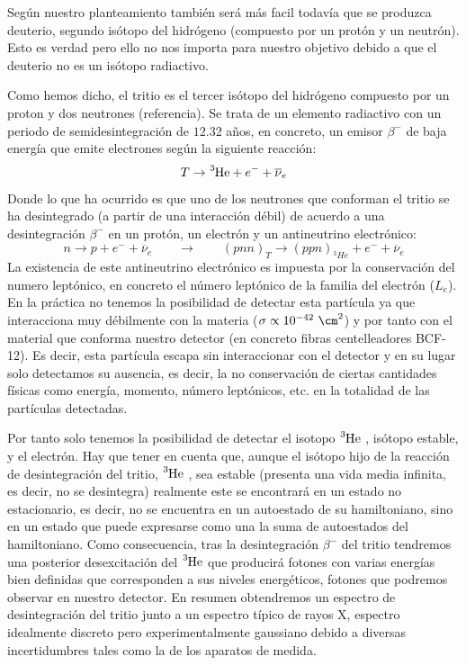 Según nuestro planteamiento también será más facil todavía que se produzca deuterio, segundo isótopo del hidrógeno (compuesto por un protón y un neutrón). Esto es verdad pero ello no nos importa para nuestro objetivo debido a que el deuterio no es un isótopo radiactivo.

Como hemos dicho, el tritio es el tercer isótopo del hidrógeno compuesto por un proton y dos neutrones (referencia). Se trata de un elemento radiactivo con un periodo de semidesintegración de $12.32$ años, en concreto, un emisor $\beta^-$ de baja energía que emite electrones según la siguiente reacción:
\begin{equation}
T \rightarrow \ce{^{3}He} + e^- + \overline{\nu}_e
\label{desintegraciontritio}
\end{equation}
Donde lo que ha ocurrido es que uno de los neutrones que conforman el tritio se ha desintegrado (a partir de una interacción débil) de acuerdo a una desintegración $\beta^-$ en un protón, un electrón y un antineutrino electrónico:
\begin{equation}
n \rightarrow p + e^- + \overline{\nu}_e \qquad \rightarrow \qquad (pnn)_T\rightarrow (ppn)_{^3He} + e^- + \overline{\nu}_e 
\label{desintegracionbeta}
\end{equation}
La existencia de este antineutrino electrónico es impuesta por la conservación del numero leptónico, en concreto el número leptónico de la familia del electrón ($L_e$). En la práctica no tenemos la posibilidad de detectar esta partícula ya que interacciona muy débilmente con la materia ($\sigma \propto 10^{-42}~\cm^2$) y por tanto con el material que conforma nuestro detector (en concreto fibras centelleadores BCF-12). Es decir, esta partícula escapa sin interaccionar con el detector y en su lugar solo detectamos su ausencia, es decir, la no conservación de ciertas cantidades físicas como energía, momento, número leptónicos, etc. en la totalidad de las partículas detectadas.

Por tanto solo tenemos la posibilidad de detectar el isotopo $\ce{^3He}$ , isótopo estable, y el electrón. Hay que tener en cuenta que, aunque el isótopo hijo de la reacción de desintegración del tritio, $\ce{^3He}$ , sea estable (presenta una vida media infinita, es decir, no se desintegra) realmente este se encontrará en un estado no estacionario, es decir, no se encuentra en un autoestado de su hamiltoniano, sino en un estado que puede expresarse como una la suma de autoestados del hamiltoniano. Como consecuencia, tras la desintegración $\beta^-$ del tritio tendremos una posterior desexcitación del $\ce{^3He}$ que producirá fotones con varias energías bien definidas que corresponden a sus niveles energéticos, fotones que podremos observar en nuestro detector. En resumen obtendremos un espectro de desintegración del tritio junto a un espectro típico de rayos X, espectro idealmente discreto pero experimentalmente gaussiano debido a diversas incertidumbres tales como la de los aparatos de medida.

